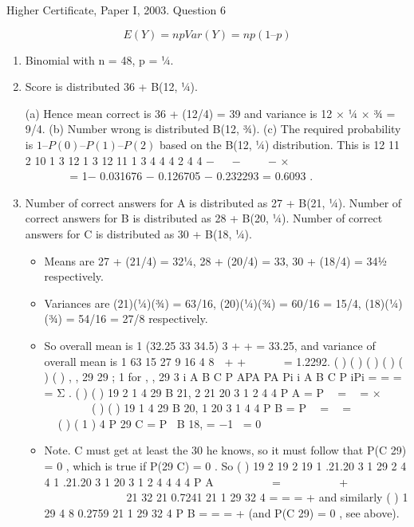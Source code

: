 \documentclass[a4paper,12pt]{article}
\begin{document}
Higher Certificate, Paper I, 2003. Question 6

\[E(Y) = np Var(Y) = np(1 – p)\]
\begin{enumerate}
\item Binomial with n = 48, p = ¼.
\item Score is distributed 36 + B(12, ¼).

(a) Hence mean correct is 36 + (12/4) = 39 and variance is 12 × ¼ × ¾ = 9/4.
(b) Number wrong is distributed B(12, ¾).
(c) The required probability is $1 – P(0) – P(1) – P(2)$ based on the B(12, ¼)
distribution. This is
12 11 2 10 1 3 12 1 3 12 11 1 3
4 4 4 2 4 4
−   −    − ×             
        
= 1− 0.031676 − 0.126705 − 0.232293 = 0.6093 .
\item Number of correct answers for A is distributed as 27 + B(21, ¼).
Number of correct answers for B is distributed as 28 + B(20, ¼).
Number of correct answers for C is distributed as 30 + B(18, ¼).

\begin{itemize}
\item Means are 27 + (21/4) = 32¼, 28 + (20/4) = 33, 30 + (18/4) = 34½
respectively.
\item  Variances are (21)(¼)(¾) = 63/16, (20)(¼)(¾) = 60/16 = 15/4, (18)(¼)(¾) =
  54/16 = 27/8 respectively.
\item So overall mean is 1 (32.25 33 34.5)
3
+ + = 33.25,
and variance of overall mean is 1 63 15 27
9 16 4 8
 + +   
 
= 1.2292.
( ) ( ) ( )
( ) ( ) ( )
, ,
29 29 ; 1 for , ,
29 3
i A B C
P APA
PA Pi i A B C
P iPi
=
  = = = Σ .
( ) ( )
19 2
1
4
29 B 21, 2 21 20 3 1
2 4 4
P A = P  =  = ×        
( ) ( )
19
1
4
29 B 20, 1 20 3 1
4 4
P B = P  =  =        
( ) ( 1 )
4 P 29 C = P B 18, = −1 = 0
\item  Note. C must get at least the 30 he knows, so it must follow that
  P(C 29) = 0 , which is true if P(29 C) = 0 .
So ( )
19 2
19 2 19
1 .21.20 3 1
29 2 4 4
1 .21.20 3 1 20 3 1
2 4 4 4 4
P A
   
   
=    
    +            
       
21
32 21 0.7241 21 1 29
32 4
= = =
  +
  and similarly
( )
1
29 4 8 0.2759 21 1 29
32 4
P B = = =
  +
  (and P(C 29) = 0 , see above).
\end{itemize}

\end{enumerate}
\end{document}
